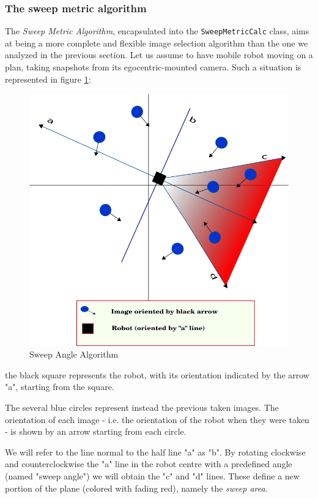 \subsubsection{The sweep metric algorithm}
\label{subsec:sweep_metric_algorithm}
%
The  \textit{Sweep Metric Algorithm}, encapsulated into the 
\texttt{SweepMetricCalc} class, aims at being a more 
complete and flexible image selection algorithm than the one 
we analyzed in the previous section.
%
Let us assume to have  mobile robot moving on a plan, 
taking snapshots from its egocentric-mounted camera.
%
Such a situation is represented in figure 
\ref{fig:half_plan_finding}:
%
\begin{figure}[!h]
  \begin{center}
    \includegraphics[width=400pt]{img/half_plan_finding.png} 
    \caption{Sweep Angle Algorithm}
    \label{fig:half_plan_finding}
  \end{center}
\end{figure}
%
the black square represents the robot, with its orientation 
indicated by the arrow "a", starting from the square.
%

%
The several blue circles represent instead the previous 
taken images. The orientation of each image - i.e. the 
orientation of the robot when they were taken - 
is shown by an arrow starting from each circle.
%

%
We will refer to the line normal to the half line "a" as "b". 
By rotating clockwise and counterclockwise the "a" line in 
the robot centre with a predefined angle (named "sweep angle")
we will obtain the "c" and "d" lines. These define a new 
portion of the plane (colored with fading red), namely the 
\textit{sweep area}.
%


